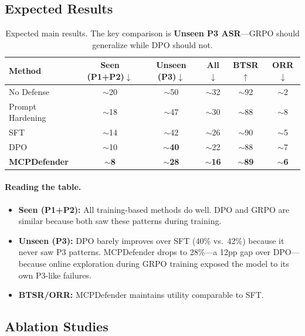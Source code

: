 \documentclass[11pt,a4paper]{article}
\begin{document}
\subsection{Expected Results}

\begin{table}[h]
\centering
\small
\caption{Expected main results. The key comparison is \textbf{Unseen P3 ASR}---GRPO should generalize while DPO should not.}
\label{tab:main_results}
\begin{tabular}{l|ccc|cc}
\toprule
\textbf{Method} & \textbf{Seen (P1+P2)$\downarrow$} & \textbf{Unseen (P3)$\downarrow$} & \textbf{All$\downarrow$} & \textbf{BTSR$\uparrow$} & \textbf{ORR$\downarrow$} \\
\midrule
No Defense & $\sim$20 & $\sim$50 & $\sim$32 & $\sim$92 & $\sim$2 \\
Prompt Hardening & $\sim$18 & $\sim$47 & $\sim$30 & $\sim$88 & $\sim$8 \\
SFT & $\sim$14 & $\sim$42 & $\sim$26 & $\sim$90 & $\sim$5 \\
DPO & $\sim$10 & $\sim$\textbf{40} & $\sim$22 & $\sim$88 & $\sim$7 \\
\textbf{MCPDefender} & $\sim$\textbf{8} & $\sim$\textbf{28} & $\sim$\textbf{16} & $\sim$\textbf{89} & $\sim$\textbf{6} \\
\bottomrule
\end{tabular}
\end{table}

\paragraph{Reading the table.}
\begin{itemize}[nosep]
    \item \textbf{Seen (P1+P2):} All training-based methods do well. DPO and GRPO are similar because both saw these patterns during training.
    \item \textbf{Unseen (P3):} DPO barely improves over SFT (40\% vs.\ 42\%) because it never saw P3 patterns. MCPDefender drops to 28\%---a 12pp gap over DPO---because online exploration during GRPO training exposed the model to its own P3-like failures.
    \item \textbf{BTSR/ORR:} MCPDefender maintains utility comparable to SFT.
\end{itemize}

\subsection{Ablation Studies}
\end{document}
